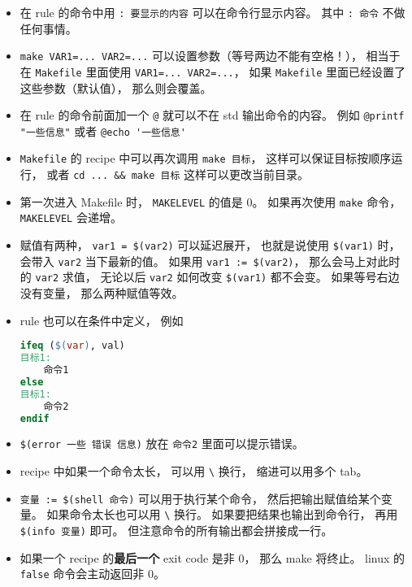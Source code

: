 \begin{itemize}
\item 在 rule 的命令中用 \verb|: 要显示的内容| 可以在命令行显示内容。 其中 \verb|: 命令| 不做任何事情。
\item \verb|make VAR1=... VAR2=...| 可以设置参数（等号两边不能有空格！）， 相当于在 \verb|Makefile| 里面使用 \verb|VAR1=... VAR2=...|， 如果 \verb|Makefile| 里面已经设置了这些参数（默认值）， 那么则会覆盖。 
\item 在 rule 的命令前面加一个 \verb|@| 就可以不在 std 输出命令的内容。 例如 \verb|@printf "一些信息"| 或者 \verb|@echo '一些信息'|
\item \verb|Makefile| 的 recipe 中可以再次调用 \verb|make 目标|， 这样可以保证目标按顺序运行， 或者 \verb|cd ... && make 目标| 这样可以更改当前目录。
\item 第一次进入 Makefile 时， \verb|MAKELEVEL| 的值是 0。 如果再次使用 \verb|make| 命令， \verb|MAKELEVEL| 会递增。
\item 赋值有两种， \verb|var1 = $(var2)| 可以延迟展开， 也就是说使用 \verb|$(var1)| 时， 会带入 \verb|var2| 当下最新的值。 如果用 \verb|var1 := $(var2)|， 那么会马上对此时的 \verb|var2| 求值， 无论以后 \verb|var2| 如何改变 \verb|$(var1)| 都不会变。 如果等号右边没有变量， 那么两种赋值等效。
\item rule 也可以在条件中定义， 例如
\begin{lstlisting}[language=makefile]
ifeq ($(var), val)
目标1:
	命令1
else
目标1:
	命令2
endif
\end{lstlisting}
\item \verb|$(error 一些 错误 信息)| 放在 \verb|命令2| 里面可以提示错误。
\item recipe 中如果一个命令太长， 可以用 \verb|\| 换行， 缩进可以用多个 tab。
\item \verb|变量 := $(shell 命令)| 可以用于执行某个命令， 然后把输出赋值给某个变量。 如果命令太长也可以用 \verb|\| 换行。 如果要把结果也输出到命令行， 再用 \verb|$(info 变量)| 即可。 但注意命令的所有输出都会拼接成一行。
\item 如果一个 recipe 的\textbf{最后一个} exit code 是非 0， 那么 make 将终止。 linux 的 \verb|false| 命令会主动返回非 0。
\end{itemize}

